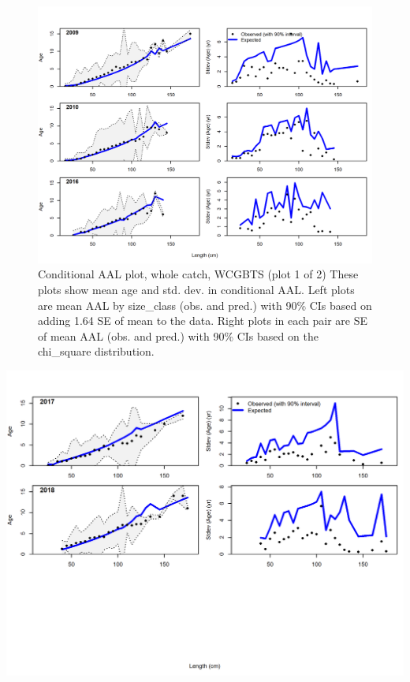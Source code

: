 \documentclass[12pt,]{article}
\begin{document}
\begin{figure}
\centering
\includegraphics{./r4ss/plots_mod1/comp_condAALfit_Andre_plotsflt5mkt0_page1.png}
\caption{Conditional AAL plot, whole catch, WCGBTS (plot 1 of 2) These
plots show mean age and std. dev. in conditional AAL. Left plots are
mean AAL by size\_class (obs. and pred.) with 90\% CIs based on adding
1.64 SE of mean to the data. Right plots in each pair are SE of mean AAL
(obs. and pred.) with 90\% CIs based on the chi\_square distribution.
\label{fig:mod1_7_comp_condAALfit_Andre_plotsflt5mkt0_page1}}
\end{figure}

\includegraphics{./r4ss/plots_mod1/comp_condAALfit_Andre_plotsflt5mkt0_page2.png}
\end{document}
